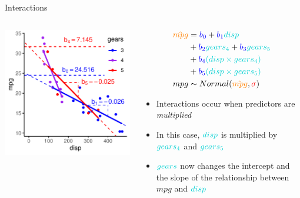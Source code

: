 \documentclass[
  ignorenonframetext,
  aspectratio=169]{beamer}
\providecommand{\tightlist}{%
  \setlength{\itemsep}{0pt}\setlength{\parskip}{0pt}}
\begin{document}
\begin{frame}{Interactions}
\protect\hypertarget{interactions-1}{}
\begin{columns}[T]
\begin{column}{0.48\textwidth}
\includegraphics{03-Lecture_files/figure-beamer/unnamed-chunk-21-1.pdf}
\end{column}

\begin{column}{0.48\textwidth}
\begin{equation*} 
\begin{split}
\textcolor{orange}{\hat{mpg}} & = \textcolor{blue}{b_0} + \textcolor{blue}{b_1}\textcolor{darkturquoise}{disp}\\
& + \textcolor{blue}{b_2}\textcolor{darkturquoise}{gears_4} + \textcolor{blue}{b_3}\textcolor{darkturquoise}{gears_5}\\
& + \textcolor{blue}{b_4}\textcolor{darkturquoise}{(disp\times gears_4)}\\
& + \textcolor{blue}{b_5}\textcolor{darkturquoise}{(disp\times gears_5)}\\
mpg & \sim Normal(\textcolor{orange}{\hat{mpg}},\textcolor{red}{\sigma})
\end{split}
\end{equation*}

\begin{itemize}
\tightlist
\item
  Interactions occur when predictors are \emph{multiplied}
\item
  In this case, \(\textcolor{darkturquoise}{disp}\) is multiplied by
  \(\textcolor{darkturquoise}{gears_4}\) and
  \(\textcolor{darkturquoise}{gears_5}\)
\item
  \(\textcolor{darkturquoise}{gears}\) now changes the intercept and the
  slope of the relationship between \(mpg\) and
  \(\textcolor{darkturquoise}{disp}\)
\end{itemize}
\end{column}
\end{columns}
\end{frame}
\end{document}
